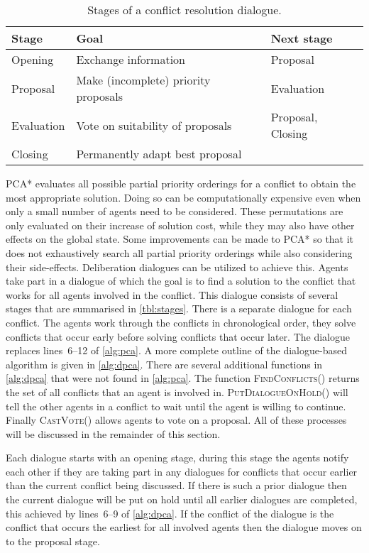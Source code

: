\begin{table}[b]
    \centering
    \caption{Stages of a conflict resolution dialogue.}
    \label{tbl:stages}
    \begin{tabular}{l|l|l}
        Stage & Goal & Next stage \\ \hline
        Opening & Exchange information & Proposal \\
        Proposal & Make (incomplete) priority proposals & Evaluation \\
        Evaluation & Vote on suitability of proposals & Proposal, Closing \\
        Closing & Permanently adapt best proposal & \\
    \end{tabular}
\end{table}

PCA* evaluates all possible partial priority orderings for a conflict to obtain 
the most appropriate solution. Doing so can be computationally expensive even 
when only a small number of agents need to be considered. These permutations 
are only evaluated on their increase of solution cost, while they may also have 
other effects on the global state. Some improvements can be made to PCA* so 
that it does not exhaustively search all partial priority orderings while also 
considering their side-effects. Deliberation dialogues can be utilized to 
achieve this.
Agents take part in a dialogue of which the goal is to find a solution to the
conflict that works for all agents involved in the conflict. This dialogue
consists of several stages that are summarised in \autoref{tbl:stages}. There 
is a separate dialogue for each conflict. The agents work through the
conflicts in chronological order, they solve conflicts that occur early before
solving conflicts that occur later. The dialogue replaces lines~6--12 of 
\autoref{alg:pca}. A more complete outline of the dialogue-based algorithm is 
given in \autoref{alg:dpca}.
There are several additional functions in \autoref{alg:dpca} that were not 
found in \autoref{alg:pca}. The function \textsc{FindConflicts()} returns the 
set of all conflicts that an agent is involved in. \textsc{PutDialogueOnHold()} 
will tell the other agents in a conflict to wait until the agent is willing to 
continue. Finally \textsc{CastVote()} allows agents to vote on a proposal. All 
of 
these processes will be discussed in the remainder of this section.

Each dialogue starts with an opening stage, during this stage the agents notify 
each other if they are taking part
in any dialogues for conflicts that occur earlier than the current conflict
being discussed. If there is such a prior dialogue then the current dialogue
will be put on hold until all earlier dialogues are completed, this achieved by 
lines~6--9 of \autoref{alg:dpca}. If the conflict 
of the dialogue is the conflict that occurs the earliest for all involved 
agents then the dialogue moves on to the proposal stage.

